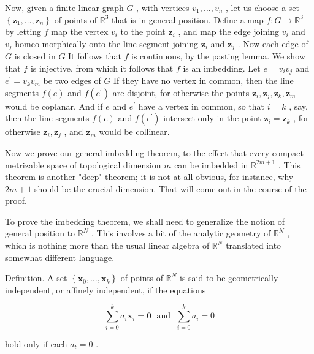 Now, given a finite linear graph \(G\) , with vertices \({v}_{1},\ldots ,{v}_{n}\) , let us choose a set \(\left\{  {{\mathbf{z}}_{1},\ldots ,{\mathbf{z}}_{n}}\right\}\) of points of \({\mathbb{R}}^{3}\) that is in general position. Define a map \(f : G \rightarrow  {\mathbb{R}}^{3}\) by letting \(f\) map the vertex \({v}_{i}\) to the point \({\mathbf{z}}_{i}\) , and map the edge joining \({v}_{i}\) and \({v}_{j}\) homeo-morphically onto the line segment joining \({\mathbf{z}}_{i}\) and \({\mathbf{z}}_{j}\) . Now each edge of \(G\) is closed in \(G\) It follows that \(f\) is continuous, by the pasting lemma. We show that \(f\) is injective, from which it follows that \(f\) is an imbedding. Let \(e = {v}_{i}{v}_{j}\) and \({e}^{\prime } = {v}_{k}{v}_{m}\) be two edges of \(G\) If they have no vertex in common, then the line segments \(f\left( e\right)\) and \(f\left( {e}^{\prime }\right)\) are disjoint, for otherwise the points \({\mathbf{z}}_{i},{\mathbf{z}}_{j},{\mathbf{z}}_{k},{\mathbf{z}}_{m}\) would be coplanar. And if \(e\) and \({e}^{\prime }\) have a vertex in common, so that \(i = k\) , say, then the line segments \(f\left( e\right)\) and \(f\left( {e}^{\prime }\right)\) intersect only in the point \({\mathbf{z}}_{i} = {\mathbf{z}}_{k}\) , for otherwise \({\mathbf{z}}_{i},{\mathbf{z}}_{j}\) , and \({\mathbf{z}}_{m}\) would be collinear.

Now we prove our general imbedding theorem, to the effect that every compact metrizable space of topological dimension \(m\) can be imbedded in \({\mathbb{R}}^{{2m} + 1}\) . This theorem is another "deep" theorem; it is not at all obvious, for instance, why \({2m} + 1\) should be the crucial dimension. That will come out in the course of the proof.

To prove the imbedding theorem, we shall need to generalize the notion of general position to \({\mathbb{R}}^{N}\) . This involves a bit of the analytic geometry of \({\mathbb{R}}^{N}\) , which is nothing more than the usual linear algebra of \({\mathbb{R}}^{N}\) translated into somewhat different language.

Definition. A set \(\left\{  {{\mathbf{x}}_{0},\ldots ,{\mathbf{x}}_{k}}\right\}\) of points of \({\mathbb{R}}^{N}\) is said to be geometrically independent, or affinely independent, if the equations

\[
\mathop{\sum }\limits_{{i = 0}}^{k}{a}_{i}{\mathbf{x}}_{i} = \mathbf{0}\;\text{ and }\;\mathop{\sum }\limits_{{i = 0}}^{k}{a}_{i} = 0
\]

hold only if each \({a}_{t} = 0\) .

